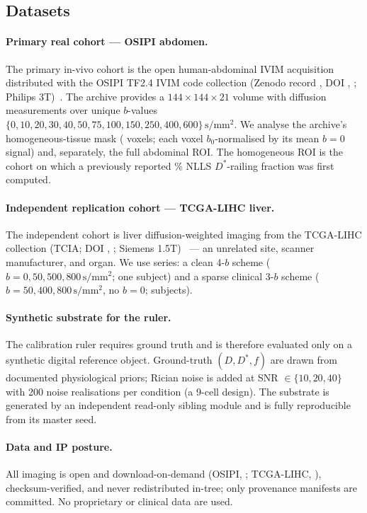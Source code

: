 \documentclass[11pt]{article}
\renewcommand{\d}{D}                 %
\newcommand{\Ds}{D^{*}}
\newcommand{\unit}[1]{\,\mathrm{#1}}
\begin{document}
\subsection{Datasets}

\paragraph{Primary real cohort --- OSIPI abdomen.} The primary in-vivo cohort is
the open human-abdominal IVIM acquisition distributed with the OSIPI TF2.4 IVIM
code collection (Zenodo record \osipiRecord, DOI \osipiDOI, \osipiLicense;
Philips 3T)~\cite{osipidata2025}. The archive provides a
$144\times144\times21$ volume with \osipiNvol{} diffusion measurements over
\osipiNb{} unique $b$-values $\{0,10,20,30,40,50,75,100,150,250,400,600\}\unit{s/mm^2}$.
We analyse the archive's homogeneous-tissue mask (\osipiHomoN{} voxels; each
voxel $b_0$-normalised by its mean $b{=}0$ signal) and, separately, the full
abdominal ROI. The homogeneous ROI is the cohort on which a previously reported
\fashionReported\% NLLS $\Ds$-railing fraction was first computed.

\paragraph{Independent replication cohort --- TCGA-LIHC liver.} The independent
cohort is liver diffusion-weighted imaging from the TCGA-LIHC collection (TCIA;
DOI \tcgaDOI, \tcgaLicense; Siemens 1.5T)~\cite{tcgalihc2016} --- an unrelated
site, scanner manufacturer, and organ. We use \tcgaNseries{} series: a clean
4-$b$ scheme ($b{=}0,50,500,800\unit{s/mm^2}$; one subject) and a sparse clinical
3-$b$ scheme ($b{=}50,400,800\unit{s/mm^2}$, no $b{=}0$; \LihcThreeSubj{} subjects).

\paragraph{Synthetic substrate for the ruler.} The calibration ruler requires
ground truth and is therefore evaluated only on a synthetic digital reference
object. Ground-truth $(\d,\Ds,f)$ are drawn from documented physiological priors;
Rician noise is added at SNR $\in\{10,20,40\}$ with 200 noise realisations per
condition (a 9-cell design). The substrate is generated by an independent
read-only sibling module and is fully reproducible from its master seed.

\paragraph{Data and IP posture.} All imaging is open and download-on-demand
(OSIPI, \osipiLicense; TCGA-LIHC, \tcgaLicense), checksum-verified, and never
redistributed in-tree; only provenance manifests are committed. No proprietary or
clinical data are used.
\end{document}
